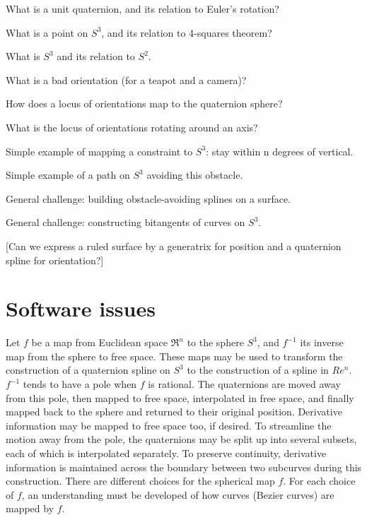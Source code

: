\documentclass[12pt]{article}
\begin{document}
What is a unit quaternion, and its relation to Euler's rotation?

What is a point on $S^3$, and its relation to 4-squares theorem?

What is $S^3$ and its relation to $S^2$.

What is a bad orientation (for a teapot and a camera)?

How does a locus of orientations map to the quaternion sphere?

What is the locus of orientations rotating around an axis?

Simple example of mapping a constraint to $S^3$: stay within n degrees of vertical.

Simple example of a path on $S^3$ avoiding this obstacle.

General challenge: building obstacle-avoiding splines on a surface.

General challenge: constructing bitangents of curves on $S^3$.

[Can we express a ruled surface by a generatrix for position and a quaternion spline
for orientation?]

\clearpage

\section{Software issues}

Let $f$ be a map from Euclidean space $\Re^n$ to the sphere $S^3$,
and $f^{-1}$ its inverse map from the sphere to free space.
These maps may be used to transform the construction of a quaternion spline on $S^3$
to the construction of a spline in $Re^n$.
$f^{-1}$ tends to have a pole when $f$ is rational.
The quaternions are moved away from this pole, then mapped to free space,
interpolated in free space, and finally mapped back to the sphere and 
returned to their original position.
Derivative information may be mapped to free space too, if desired.
To streamline the motion away from the pole, the quaternions may be split
up into several subsets, each of which is interpolated separately.
To preserve continuity, derivative information is maintained across the boundary 
between two subcurves during this construction.
There are different choices for the spherical map $f$.
For each choice of $f$, an understanding must be developed 
of how curves (Bezier curves) are mapped by $f$.
\end{document}
